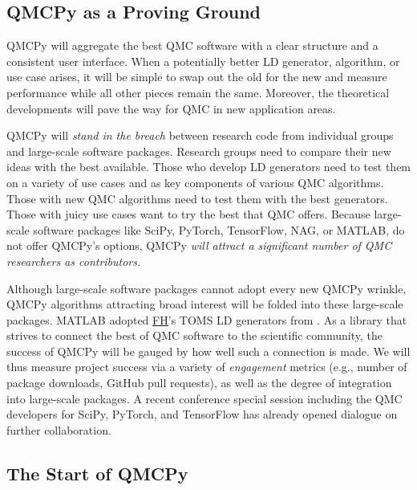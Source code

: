 \documentclass[11pt]{NSFamsart}
\newcommand{\cmtS}[1]{{\color{blue}{(Simon: #1)}}}
\newcommand{\FH}{\hyperlink{FHlink}{FH}\xspace}
\newcommand{\SciPy}{SciPy\xspace}
\newcommand{\TensorFlow}{TensorFlow\xspace}
\newcommand{\NAG}{NAG\xspace}
\newcommand{\MATLAB}{MATLAB\xspace}
\newcommand{\PyTorch}{PyTorch\xspace}
\begin{document}
\subsection{QMCPy as a Proving Ground} \label{sec:provingground}
\cmtS{Fred \& Yuhan: maybe shorten the writing below, and focus on QMCPy as a vessel for connecting our new methods (\& existing state-of-the-art) to scientific practitioners who will use such tools for cost-efficient solutions to cutting-edge scientific problems.} QMCPy will aggregate the best QMC software with a clear structure and a consistent user interface.  When a potentially better LD generator, algorithm, or use case arises, it will be simple to swap out the old for the new and measure performance while all other pieces remain the same.  Moreover, the theoretical developments will pave the way for QMC in new application areas.

QMCPy will \emph{stand in the breach} between research code from individual groups and large-scale software packages.  Research groups need to compare their new ideas with the best available.  Those who develop LD generators need to test them on a variety of use cases and as key components of various QMC algorithms.  Those with new QMC algorithms need to test them with the best generators.  Those with juicy use cases want to try the best that QMC offers.  Because large-scale software packages like \SciPy, \PyTorch, \TensorFlow, \NAG, or \MATLAB, do not offer QMCPy's options,  QMCPy \emph{will attract a significant number of QMC researchers as contributors.}

Although large-scale software packages cannot adopt every new QMCPy wrinkle, QMCPy algorithms attracting broad interest will be folded into these large-scale packages. \MATLAB adopted \FH's TOMS LD generators from \cite{HonHic00a}. As a library that strives to connect the best of QMC software to the scientific community, the success of QMCPy will be gauged by how well such a connection is made. We will thus measure project success via a variety of \emph{engagement} metrics (e.g., number of package downloads, GitHub pull requests), as well as the degree of integration into large-scale packages.  A recent conference special session including the QMC developers for \SciPy, \PyTorch, and \TensorFlow has already opened dialogue on further collaboration.

\subsection*{The Start of QMCPy}
\end{document}
